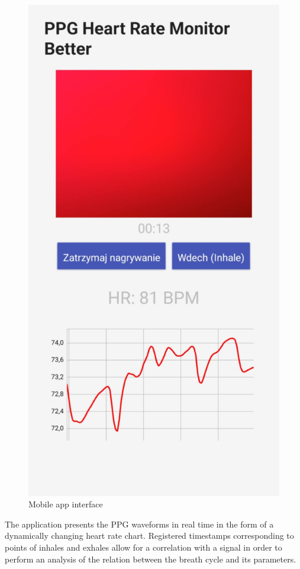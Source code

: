 \documentclass[journal]{IEEEtran}
\begin{document}
\begin{figure}[htbp]
    \centering
    \includegraphics[scale=0.17]{aplikacja.png}
    \caption{Mobile app interface}
    \label{fig:aplikacja_mobilna}
\end{figure}


The application presents the PPG waveforms in real time in the form of a dynamically changing heart rate chart. Registered timestamps corresponding to points of inhales and exhales allow for a correlation with a signal in order to perform an analysis of the relation between the breath cycle and its parameters.
\end{document}
